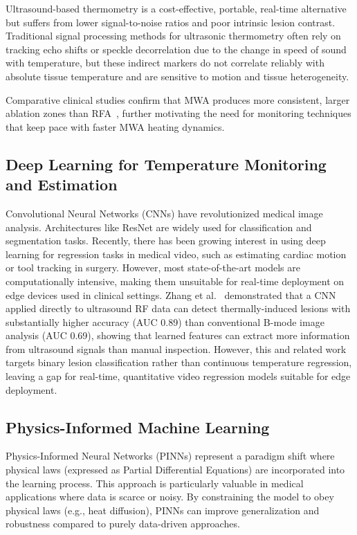 \documentclass[conference]{IEEEtran}
\begin{document}
Ultrasound-based thermometry is a cost-effective, portable, real-time alternative but suffers from lower signal-to-noise ratios and poor intrinsic lesion contrast. 
Traditional signal processing methods for ultrasonic thermometry often rely on tracking echo shifts or speckle decorrelation due to the change in speed of sound with temperature, but these indirect markers do not correlate reliably with absolute tissue temperature and are sensitive to motion and tissue heterogeneity.\cite{liuContrastenhancedUltrasoundguidedMicrowave2011, zhangFeasibilityUsingUltrasonic2017, zhangExVivoVivo2018, frieserEfficacyContrastenhancedUS2011, lewisThermometryAblationMonitoring2015}


Comparative clinical studies confirm that MWA produces more consistent, larger ablation zones than RFA~\cite{Shibata2000}, further motivating the need for monitoring techniques that keep pace with faster MWA heating dynamics.

\subsection{Deep Learning for Temperature Monitoring and Estimation}
Convolutional Neural Networks (CNNs) have revolutionized medical image analysis. Architectures like ResNet \cite{he2016deep} are widely used for classification and segmentation tasks.
 Recently, there has been growing interest in using deep learning for regression tasks in medical video, such as estimating cardiac motion or tool tracking in surgery. 
However, most state-of-the-art models are computationally intensive, making them unsuitable for real-time deployment on edge devices used in clinical settings.
Zhang et al.~\cite{Zhang2020} demonstrated that a CNN applied directly to ultrasound RF data can detect thermally-induced lesions with substantially higher accuracy (AUC 0.89) than conventional B-mode image analysis (AUC 0.69), showing that learned features can extract more information from ultrasound signals than manual inspection. 
However, this and related work targets binary lesion classification rather than continuous temperature regression, leaving a gap for real-time, quantitative video regression models suitable for edge deployment.

\subsection{Physics-Informed Machine Learning}
Physics-Informed Neural Networks (PINNs) \cite{raissi2019physics} represent a paradigm shift where physical laws (expressed as Partial Differential Equations) are incorporated into the learning process. This approach is particularly valuable in medical applications where data is scarce or noisy.
By constraining the model to obey physical laws (e.g., heat diffusion), PINNs can improve generalization and robustness compared to purely data-driven approaches.
\end{document}

